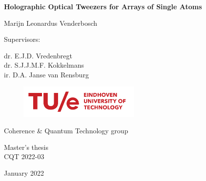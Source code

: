 \begin{titlepage}
	\begin{centering}
		\vspace*{3cm}
		
		\textsf{\LARGE \textbf{Holographic Optical Tweezers for Arrays of Single Atoms}}
		
		\vspace{2.5cm}
		
		\vspace{0.5cm}
		
		\textsf{\Large Marijn Leonardus Venderbosch}
		
		\vspace{2cm}
		
		\textsf{\large Supervisors:}
		
		\vspace{0.5cm}
		
		\textsf{\large dr. E.J.D. Vredenbregt\\
			dr. S.J.J.M.F. Kokkelmans\\
			ir. D.A. Janse van Rensburg
			}
		
		\vfill
		
		\begin{figure}[h]
			\centering
			\includegraphics[width=6cm]{figures/TUeLogo.png}
		\end{figure}
		
		\textsf{Coherence \& Quantum Technology group}
		
		\vspace{0.4cm}	
		
		\textsf{Master's thesis}\\
		\textsf{CQT 2022-03}
		
		\vspace{0.4cm}	
		
		\textsf{January 2022}
		
		\vspace{1cm}
		
		
	\end{centering}
\end{titlepage}



